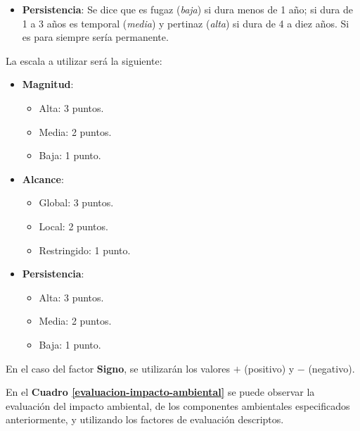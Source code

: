 {\begin{itemize}
    \item \textbf{Persistencia}:
    Se dice que es fugaz (\textit{baja}) si dura menos de 1 año; si dura de 1 a 3 años es temporal (\textit{media}) y pertinaz (\textit{alta}) si dura de 4 a diez años.
    Si es para siempre sería permanente.
\end{itemize}


La escala a utilizar será la siguiente:
\begin{itemize}
    \item \textbf{Magnitud}:
        \begin{itemize}
            \item Alta: 3 puntos.
            \item Media: 2 puntos.
            \item Baja: 1 punto.
        \end{itemize}
    
    \item \textbf{Alcance}:
        \begin{itemize}
            \item Global: 3 puntos.
            \item Local: 2 puntos.
            \item Restringido: 1 punto.
        \end{itemize}
    
    \item \textbf{Persistencia}:
        \begin{itemize}
            \item Alta: 3 puntos.
            \item Media: 2 puntos.
            \item Baja: 1 punto.
        \end{itemize}
\end{itemize}

En el caso del factor \textbf{Signo}, se utilizarán los valores \textit{$+$} (positivo) y \textit{$-$} (negativo).

En el \textbf{Cuadro \ref{evaluacion-impacto-ambiental}} se puede observar la evaluación del impacto ambiental, de los componentes ambientales especificados anteriormente, y utilizando los factores de evaluación descriptos.

\begin{table}[h]
    \centering
\end{table}}
